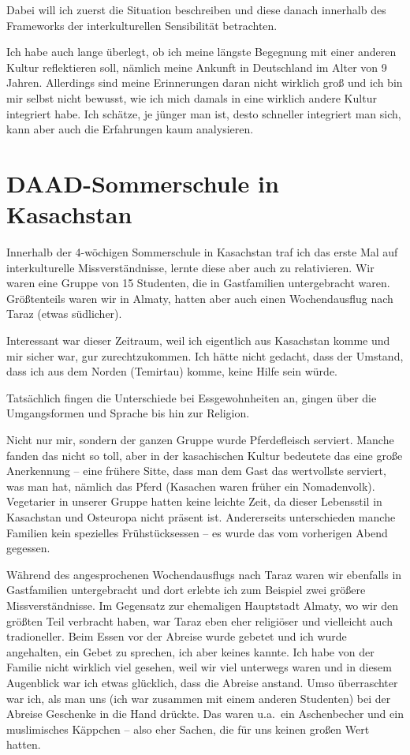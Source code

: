 \documentclass[12pt,headsepline,a4paper]{scrartcl}
\begin{document}
Dabei will ich zuerst die Situation beschreiben und diese danach innerhalb des Frameworks der interkulturellen Sensibilität betrachten.

Ich habe auch lange überlegt, ob ich meine längste Begegnung mit einer anderen Kultur reflektieren soll, nämlich meine Ankunft in Deutschland im Alter von 9 Jahren. 
Allerdings sind meine Erinnerungen daran nicht wirklich groß und ich bin mir selbst nicht bewusst, wie ich mich damals in eine wirklich andere Kultur integriert habe. Ich schätze, je jünger man ist, desto schneller integriert man sich, kann aber auch die Erfahrungen kaum analysieren.

\section{DAAD-Sommerschule in Kasachstan}
Innerhalb der 4-wöchigen Sommerschule in Kasachstan traf ich das erste Mal auf interkulturelle Missverständnisse, lernte diese aber auch zu relativieren. 
Wir waren eine Gruppe von 15 Studenten, die in Gastfamilien untergebracht waren. 
Größtenteils waren wir in Almaty, hatten aber auch einen Wochendausflug nach Taraz (etwas südlicher). 

Interessant war dieser Zeitraum, weil ich eigentlich aus Kasachstan komme und mir sicher war, gur zurechtzukommen. 
Ich hätte nicht gedacht, dass der Umstand, dass ich aus dem Norden (Temirtau) komme, keine Hilfe sein würde.

Tatsächlich fingen die Unterschiede bei Essgewohnheiten an, gingen über die Umgangsformen und Sprache bis hin zur Religion. 

Nicht nur mir, sondern der ganzen Gruppe wurde Pferdefleisch serviert. 
Manche fanden das nicht so toll, aber in der kasachischen Kultur bedeutete das eine große Anerkennung – eine frühere Sitte, dass man dem Gast das wertvollste serviert, was man hat, nämlich das Pferd (Kasachen waren früher ein Nomadenvolk). 
Vegetarier in unserer Gruppe hatten keine leichte Zeit, da dieser Lebensstil in Kasachstan und Osteuropa nicht präsent ist. 
Andererseits unterschieden manche Familien kein spezielles Frühstücksessen -- es wurde das vom vorherigen Abend gegessen. 

Während des angesprochenen Wochendausflugs nach Taraz waren wir ebenfalls in Gastfamilien untergebracht und dort erlebte ich zum Beispiel zwei größere Missverständnisse. 
Im Gegensatz zur ehemaligen Hauptstadt Almaty, wo wir den größten Teil verbracht haben, war Taraz eben eher religiöser und vielleicht auch tradioneller. 
Beim Essen vor der Abreise wurde gebetet und ich wurde angehalten, ein Gebet zu sprechen, ich aber keines kannte. 
Ich habe von der Familie nicht wirklich viel gesehen, weil wir viel unterwegs waren und in diesem Augenblick war ich etwas glücklich, dass die Abreise anstand. 
Umso überraschter war ich, als man uns (ich war zusammen mit einem anderen Studenten) bei der Abreise Geschenke in die Hand drückte. 
Das waren u.a.\ ein Aschenbecher und ein muslimisches Käppchen – also eher Sachen, die für uns keinen großen Wert hatten.
\end{document}
